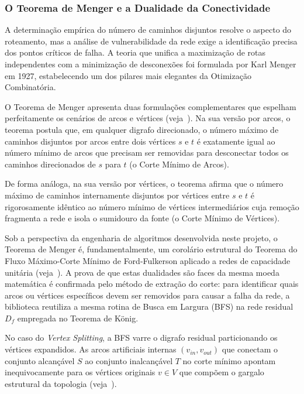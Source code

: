 \documentclass[12pt,a4paper]{article}
\begin{document}
\subsubsection{O Teorema de Menger e a Dualidade da Conectividade}

A determinação empírica do número de caminhos disjuntos resolve o aspecto do roteamento, mas a análise de vulnerabilidade da rede exige a identificação precisa dos pontos críticos de falha. A teoria que unifica a maximização de rotas independentes com a minimização de desconexões foi formulada por Karl Menger em 1927, estabelecendo um dos pilares mais elegantes da Otimização Combinatória.

O Teorema de Menger apresenta duas formulações complementares que espelham perfeitamente os cenários de arcos e vértices (veja~\cite{cook1998combinatorial}). Na sua versão por arcos, o teorema postula que, em qualquer digrafo direcionado, o número máximo de caminhos disjuntos por arcos entre dois vértices $s$ e $t$ é exatamente igual ao número mínimo de arcos que precisam ser removidas para desconectar todos os caminhos direcionados de $s$ para $t$ (o Corte Mínimo de Arcos).

De forma análoga, na sua versão por vértices, o teorema afirma que o número máximo de caminhos internamente disjuntos por vértices entre $s$ e $t$ é rigorosamente idêntico ao número mínimo de vértices intermediários cuja remoção fragmenta a rede e isola o sumidouro da fonte (o Corte Mínimo de Vértices).

Sob a perspectiva da engenharia de algoritmos desenvolvida neste projeto, o Teorema de Menger é, fundamentalmente, um corolário estrutural do Teorema do Fluxo Máximo-Corte Mínimo de Ford-Fulkerson aplicado a redes de capacidade unitária (veja~\cite{ahuja1993network}). A prova de que estas dualidades são faces da mesma moeda matemática é confirmada pelo método de extração do corte: para identificar quais arcos ou vértices específicos devem ser removidos para causar a falha da rede, a biblioteca reutiliza a mesma rotina de Busca em Largura (BFS) na rede residual $D_f$ empregada no Teorema de König.

No caso do \textit{Vertex Splitting}, a BFS varre o digrafo residual particionando os vértices expandidos. As arcos artificiais internas $(v_{in}, v_{out})$ que conectam o conjunto alcançável $S$ ao conjunto inalcançável $T$ no corte mínimo apontam inequivocamente para os vértices originais $v \in V$ que compõem o gargalo estrutural da topologia (veja~\cite{korte2018combinatorial}).
\end{document}
